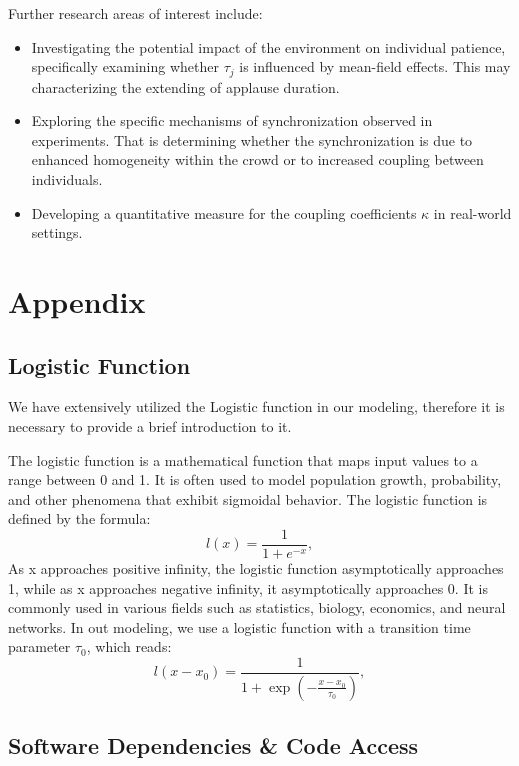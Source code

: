 \documentclass[UTF8,a4paper,11pt]{ctexart}
\begin{document}
Further research areas of interest include:

\begin{itemize}
\item Investigating the potential impact of the environment on individual patience, specifically examining whether $τ_j$ is influenced by mean-field effects. This may characterizing the extending of applause duration.

\item Exploring the specific mechanisms of synchronization observed in experiments. That is determining whether the synchronization is due to enhanced homogeneity within the crowd or to increased coupling between individuals.

\item Developing a quantitative measure for the coupling coefficients $κ$ in real-world settings.
\end{itemize}

\section{Appendix}
\subsection{Logistic Function}

We have extensively utilized the Logistic function in our modeling, therefore it is necessary to provide a brief introduction to it.

The logistic function is a mathematical function that maps input values to a range between 0 and 1. It is often used to model population growth, probability, and other phenomena that exhibit sigmoidal behavior. The logistic function is defined by the formula:
\begin{equation}
    l(x) = \frac{1}{1+e^{-x}},
\end{equation}
As x approaches positive infinity, the logistic function asymptotically approaches 1, while as x approaches negative infinity, it asymptotically approaches 0. It is commonly used in various fields such as statistics, biology, economics, and neural networks. In out modeling, we use a logistic function with a transition time parameter $τ_0$, which reads:
\begin{equation}
    l(x-x_0) = \frac{1}{1+\exp\left( -\frac{x-x_0}{τ_0} \right)},
\end{equation}

\subsection{Software Dependencies \& Code Access}
\end{document}
